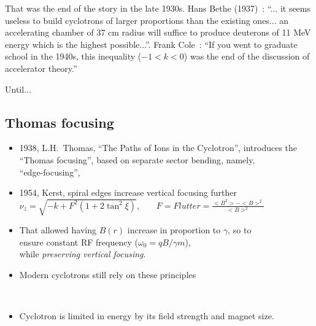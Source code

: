 That was the end of the story in the late 1930s. 
Hans Bethe (1937)~: 
``... it seems useless to build cyclotrons of larger proportions than the  
existing ones... an accelerating chamber of 37 cm radius will  suffice to 
produce deuterons of 11 MeV energy which is the highest possible...''. 
Frank Cole~: ``If you went to graduate school in the 1940s, this inequality ($−1 <
k < 0$) was the end of the discussion of accelerator theory.''

  Until...

\subsection{Thomas focusing}

\begin{itemize}
\item[\bull]  1938, L.H.~Thomas, ``The Paths of Ions in the Cyclotron'', 
introduces the \\
 ``Thomas focusing'', based on separate sector bending, namely,  \\
``edge-focusing'', 
\item[\bull]  1954, Kerst, spiral edges increase vertical focusing further \\
$\nu_z = \sqrt{-k + F^2(1 + 2 \tan^2 \xi)}$, ~ ~ $F=Flutter = \frac{<B^2> - <B>^2}{<B>^2}$
\item[\bull]  That allowed having $B(r)$ increase in proportion to $\gamma$, so to \\ 
ensure constant RF frequency  ($\omega_0 = qB / \gamma m$), \\
while {\it preserving vertical focusing}.  

\item[\bull]  Modern cyclotrons still rely on these principles


\vspace{0mm}

~

\item[\bull] Cyclotron is limited in energy by its field strength and magnet size. 
\end{itemize}




